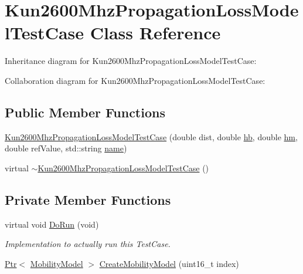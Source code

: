 \hypertarget{classKun2600MhzPropagationLossModelTestCase}{}\section{Kun2600\+Mhz\+Propagation\+Loss\+Model\+Test\+Case Class Reference}
\label{classKun2600MhzPropagationLossModelTestCase}


Inheritance diagram for Kun2600\+Mhz\+Propagation\+Loss\+Model\+Test\+Case\+:


Collaboration diagram for Kun2600\+Mhz\+Propagation\+Loss\+Model\+Test\+Case\+:
\subsection*{Public Member Functions}
\begin{DoxyCompactItemize}
\item 
\hyperlink{classKun2600MhzPropagationLossModelTestCase_a52f29e8a3007f1f62f3488b88acdb7c4}{Kun2600\+Mhz\+Propagation\+Loss\+Model\+Test\+Case} (double dist, double \hyperlink{lte__pathloss_8m_a193c482b47dea4d7243e253acc8b2bee}{hb}, double \hyperlink{lte__pathloss_8m_adf48bfd0f3afa8972e753a0f895b0a51}{hm}, double ref\+Value, std\+::string \hyperlink{generate__test__data__lte__spectrum__model_8m_ab74e6bf80237ddc4109968cedc58c151}{name})
\item 
virtual \hyperlink{classKun2600MhzPropagationLossModelTestCase_a31d6b0d2cbe5f6d068d2e885d8bdd124}{$\sim$\+Kun2600\+Mhz\+Propagation\+Loss\+Model\+Test\+Case} ()
\end{DoxyCompactItemize}
\subsection*{Private Member Functions}
\begin{DoxyCompactItemize}
\item 
virtual void \hyperlink{classKun2600MhzPropagationLossModelTestCase_aa5278eaa92b5abce1cd91bfea29ec794}{Do\+Run} (void)
\begin{DoxyCompactList}\small\item\em Implementation to actually run this Test\+Case. \end{DoxyCompactList}\item 
\hyperlink{classns3_1_1Ptr}{Ptr}$<$ \hyperlink{classns3_1_1MobilityModel}{Mobility\+Model} $>$ \hyperlink{classKun2600MhzPropagationLossModelTestCase_a0ade64f40a71998882103c1ec7eb69de}{Create\+Mobility\+Model} (uint16\+\_\+t index)
\end{DoxyCompactItemize}
